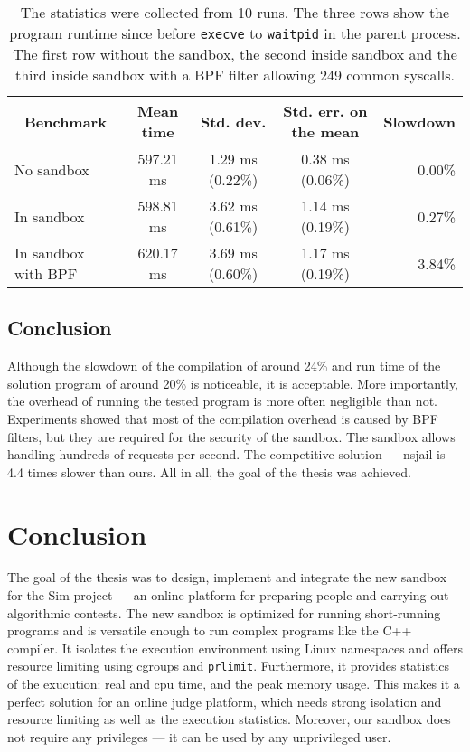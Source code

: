 \documentclass[en]{pracamgr}
\begin{document}
\begin{table}[h]
\centering
\begin{tabular}{|l|c|c|c|r|}
\hline
\multicolumn{1}{|c|}{Benchmark} & Mean time & Std. dev. & Std. err. on the mean & \multicolumn{1}{c|}{Slowdown} \\
\hline
No sandbox          & 597.21 ms & 1.29 ms (0.22\%) & 0.38 ms (0.06\%) & 0.00\% \\
In sandbox          & 598.81 ms & 3.62 ms (0.61\%) & 1.14 ms (0.19\%) & 0.27\% \\
In sandbox with BPF & 620.17 ms & 3.69 ms (0.60\%) & 1.17 ms (0.19\%) & 3.84\% \\
\hline
\end{tabular}
\caption{The statistics were collected from 10 runs. The three rows show the program runtime since before \texttt{execve} to \texttt{waitpid} in the parent process. The first row without the sandbox, the second inside sandbox and the third inside sandbox with a BPF filter allowing 249 common syscalls.}
\label{table:million_lseek}
\end{table}

\fi

\section{Conclusion}

Although the slowdown of the compilation of around 24\% and run time of the solution program of around 20\% is noticeable, it is acceptable. More importantly, the overhead of running the tested program is more often negligible than not. Experiments showed that most of the compilation overhead is caused by BPF filters, but they are required for the security of the sandbox. The sandbox allows handling hundreds of requests per second. The competitive solution --- nsjail is 4.4 times slower than ours. All in all, the goal of the thesis was achieved.

\chapter{Conclusion}\label{chapter:conclusion}

The goal of the thesis was to design, implement and integrate the new sandbox for the Sim project \cite{sim_project} --- an online platform for preparing people and carrying out algorithmic contests. The new sandbox is optimized for running short-running programs and is versatile enough to run complex programs like the C++ compiler. It isolates the execution environment using Linux namespaces and offers resource limiting using cgroups and \texttt{prlimit}. Furthermore, it provides statistics of the exucution: real and cpu time, and the peak memory usage. This makes it a perfect solution for an online judge platform, which needs strong isolation and resource limiting as well as the execution statistics. Moreover, our sandbox does not require any privileges --- it can be used by any unprivileged user.
\end{document}
